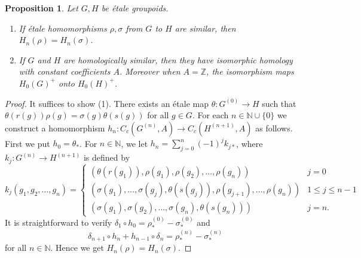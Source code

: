 \documentclass[11pt]{article}
\newtheorem{prop}[thm]{Proposition}
\theoremstyle{definition}
\newcommand{\N}{\mathbb{N}}
\newcommand{\Z}{\mathbb{Z}}
\begin{document}
\begin{prop}\label{homosim}
Let $G,H$ be \'etale groupoids. 
\begin{enumerate}
\item If \'etale homomorphisms $\rho,\sigma$ from $G$ to $H$ are similar, then 
$H_n(\rho)=H_n(\sigma)$. 
\item If $G$ and $H$ are homologically similar, 
then they have isomorphic homology with constant coefficients $A$. 
Moreover when $A=\Z$, the isomorphism maps $H_0(G)^+$ onto $H_0(H)^+$. 
\end{enumerate}
\end{prop}
\begin{proof}
It suffices to show (1). 
There exists an \'etale map $\theta:G^{(0)}\to H$ such that 
$\theta(r(g))\rho(g)=\sigma(g)\theta(s(g))$ for all $g\in G$. 
For each $n\in\N\cup\{0\}$ 
we construct a homomorphism $h_n:C_c(G^{(n)},A)\to C_c(H^{(n+1)},A)$ 
as follows. 
First we put $h_0=\theta_*$. 
For $n\in\N$, we let $h_n=\sum_{j=0}^n(-1)^jk_{j*}$, 
where $k_j:G^{(n)}\to H^{(n+1)}$ is defined by 
\[
k_j(g_1,g_2,\dots,g_n)=\begin{cases}
(\theta(r(g_1)),\rho(g_1),\rho(g_2),\dots,\rho(g_n)) & j=0 \\
(\sigma(g_1),\dots,\sigma(g_j),\theta(s(g_j)),
\rho(g_{j+1}),\dots,\rho(g_n)) & 1\leq j\leq n-1 \\
(\sigma(g_1),\sigma(g_2),\dots,\sigma(g_n),\theta(s(g_n))) & j=n. 
\end{cases}
\]
It is straightforward to verify 
$\delta_1\circ h_0=\rho^{(0)}_*-\sigma^{(0)}_*$ and 
\[
\delta_{n+1}\circ h_n+h_{n-1}\circ\delta_n
=\rho^{(n)}_*-\sigma^{(n)}_*
\]
for all $n\in\N$. 
Hence we get $H_n(\rho)=H_n(\sigma)$. 
\end{proof}
\end{document}
